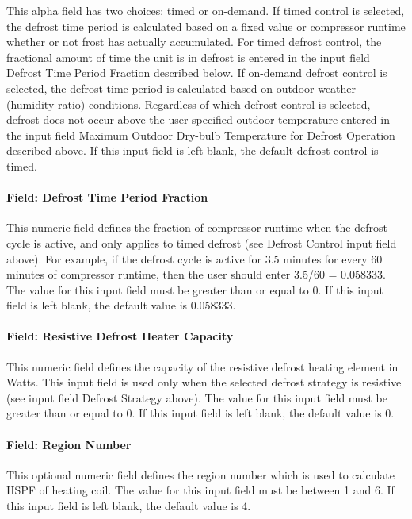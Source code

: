 This alpha field has two choices: timed or on-demand. If timed control is selected, the defrost time period is calculated based on a fixed value or compressor runtime whether or not frost has actually accumulated. For timed defrost control, the fractional amount of time the unit is in defrost is entered in the input field Defrost Time Period Fraction described below. If on-demand defrost control is selected, the defrost time period is calculated based on outdoor weather (humidity ratio) conditions. Regardless of which defrost control is selected, defrost does not occur above the user specified outdoor temperature entered in the input field Maximum Outdoor Dry-bulb Temperature for Defrost Operation described above. If this input field is left blank, the default defrost control is timed.

\paragraph{Field: Defrost Time Period Fraction}\label{field-defrost-time-period-fraction}

This numeric field defines the fraction of compressor runtime when the defrost cycle is active, and only applies to timed defrost (see Defrost Control input field above). For example, if the defrost cycle is active for 3.5 minutes for every 60 minutes of compressor runtime, then the user should enter 3.5/60 = 0.058333. The value for this input field must be greater than or equal to 0. If this input field is left blank, the default value is 0.058333.

\paragraph{Field: Resistive Defrost Heater Capacity}\label{field-resistive-defrost-heater-capacity}

This numeric field defines the capacity of the resistive defrost heating element in Watts. This input field is used only when the selected defrost strategy is resistive (see input field Defrost Strategy above). The value for this input field must be greater than or equal to 0. If this input field is left blank, the default value is 0.

\paragraph{Field: Region Number}\label{field-region-number}

This optional numeric field defines the region number which is used to calculate HSPF of heating coil. The value for this input field must be between 1 and 6. If this input field is left blank, the default value is 4.

